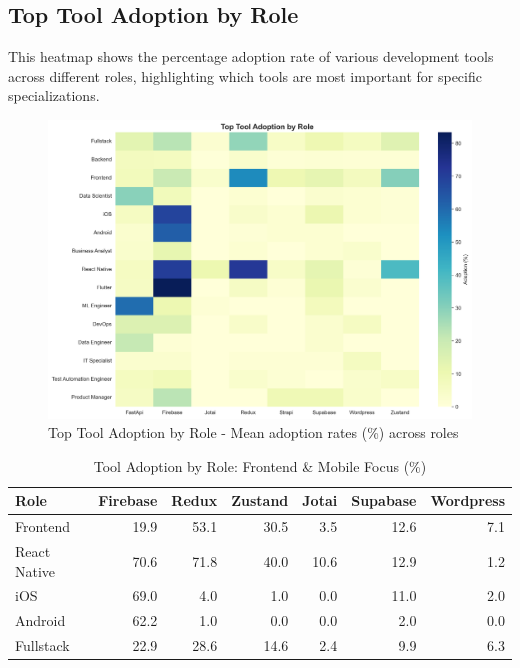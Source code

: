 \documentclass[12pt,a4paper]{article}
\begin{document}
\subsection{Top Tool Adoption by Role}
This heatmap shows the percentage adoption rate of various development tools across different roles, highlighting which tools are most important for specific specializations.

\begin{figure}[H]
	\centering
	\includegraphics[width=\textwidth]{figures/heatmap_tool_adoption_by_role.png}
	\caption{Top Tool Adoption by Role - Mean adoption rates (\%) across roles}
\end{figure}

\begin{table}[H]
    \centering
    \caption{Tool Adoption by Role: Frontend \& Mobile Focus (\%)}
    \label{tab:tool_adoption_fe_mobile}
    \small
    \begin{tabular}{lrrrrrr}
        \toprule
        \textbf{Role} & \textbf{Firebase} & \textbf{Redux} & \textbf{Zustand} & \textbf{Jotai} & \textbf{Supabase} & \textbf{Wordpress} \\
        \midrule
        Frontend & 19.9 & 53.1 & 30.5 & 3.5 & 12.6 & 7.1 \\
        React Native & 70.6 & 71.8 & 40.0 & 10.6 & 12.9 & 1.2 \\
        iOS & 69.0 & 4.0 & 1.0 & 0.0 & 11.0 & 2.0 \\
        Android & 62.2 & 1.0 & 0.0 & 0.0 & 2.0 & 0.0 \\
        Fullstack & 22.9 & 28.6 & 14.6 & 2.4 & 9.9 & 6.3 \\
        \bottomrule
    \end{tabular}
\end{table}
\end{document}
